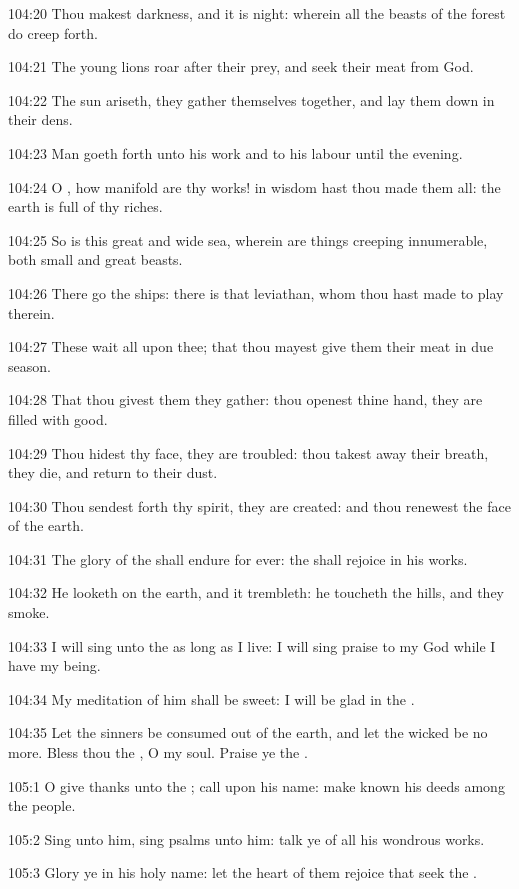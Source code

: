 104:20 Thou makest darkness, and it is night: wherein all the beasts
of the forest do creep forth.

104:21 The young lions roar after their prey, and seek their meat from
God.

104:22 The sun ariseth, they gather themselves together, and lay them
down in their dens.

104:23 Man goeth forth unto his work and to his labour until the
evening.

104:24 O \LORD, how manifold are thy works! in wisdom hast thou made
them all: the earth is full of thy riches.

104:25 So is this great and wide sea, wherein are things creeping
innumerable, both small and great beasts.

104:26 There go the ships: there is that leviathan, whom thou hast
made to play therein.

104:27 These wait all upon thee; that thou mayest give them their meat
in due season.

104:28 That thou givest them they gather: thou openest thine hand,
they are filled with good.

104:29 Thou hidest thy face, they are troubled: thou takest away their
breath, they die, and return to their dust.

104:30 Thou sendest forth thy spirit, they are created: and thou
renewest the face of the earth.

104:31 The glory of the \LORD shall endure for ever: the \LORD shall
rejoice in his works.

104:32 He looketh on the earth, and it trembleth: he toucheth the
hills, and they smoke.

104:33 I will sing unto the \LORD as long as I live: I will sing praise
to my God while I have my being.

104:34 My meditation of him shall be sweet: I will be glad in the
\LORD.

104:35 Let the sinners be consumed out of the earth, and let the
wicked be no more. Bless thou the \LORD, O my soul. Praise ye the \LORD.



105:1 O give thanks unto the \LORD; call upon his name: make known his
deeds among the people.

105:2 Sing unto him, sing psalms unto him: talk ye of all his wondrous
works.

105:3 Glory ye in his holy name: let the heart of them rejoice that
seek the \LORD.

